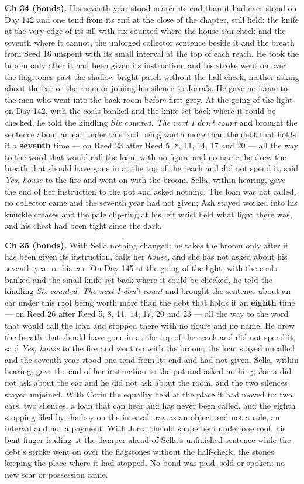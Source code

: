 \documentclass{design/chronicle}
\begin{document}
{\textbf{Ch 34 (bonds).} His seventh year stood nearer its end than it had ever stood on Day 142 and one tend from its end at the close of the chapter, still held: the knife at the very edge of its sill with six counted where the house can check and the seventh where it cannot, the unforged collector sentence beside it and the breath from Seed 16 unspent with its small interval at the top of each reach. He took the broom only after it had been given its instruction, and his stroke went on over the flagstones past the shallow bright patch without the half-check, neither asking about the ear or the room or joining his silence to Jorra’s. He gave no name to the men who went into the back room before first grey. At the going of the light on Day 142, with the coals banked and the knife set back where it could be checked, he told the kindling \emph{Six counted. The next I don’t count} and brought the sentence about an ear under this roof being worth more than the debt that holds it a \textbf{seventh} time — on Reed 23 after Reed 5, 8, 11, 14, 17 and 20 — all the way to the word that would call the loan, with no figure and no name; he drew the breath that should have gone in at the top of the reach and did not spend it, said \emph{Yes, house} to the fire and went on with the broom. Sella, within hearing, gave the end of her instruction to the pot and asked nothing. The loan was not called, no collector came and the seventh year had not given; Ash stayed worked into his knuckle creases and the pale clip-ring at his left wrist held what light there was, and his chest had been tight since the dark.

\textbf{Ch 35 (bonds).} With Sella nothing changed: he takes the broom only after it has been given its instruction, calls her \emph{house}, and she has not asked about his seventh year or his ear. On Day 145 at the going of the light, with the coals banked and the small knife set back where it could be checked, he told the kindling \emph{Six counted. The next I don’t count} and brought the sentence about an ear under this roof being worth more than the debt that holds it an \textbf{eighth} time — on Reed 26 after Reed 5, 8, 11, 14, 17, 20 and 23 — all the way to the word that would call the loan and stopped there with no figure and no name. He drew the breath that should have gone in at the top of the reach and did not spend it, said \emph{Yes, house} to the fire and went on with the broom; the loan stayed uncalled and the seventh year stood one tend from its end and had not given. Sella, within hearing, gave the end of her instruction to the pot and asked nothing; Jorra did not ask about the ear and he did not ask about the room, and the two silences stayed unjoined. With Corin the equality held at the place it had moved to: two ears, two silences, a loan that can hear and has never been called, and the eighth stopping filed by the boy on the interval tray as an object and not a rule, an interval and not a payment. With Jorra the old shape held under one roof, his bent finger leading at the damper ahead of Sella’s unfinished sentence while the debt’s stroke went on over the flagstones without the half-check, the stones keeping the place where it had stopped. No bond was paid, sold or spoken; no new scar or possession came.

}
\end{document}
